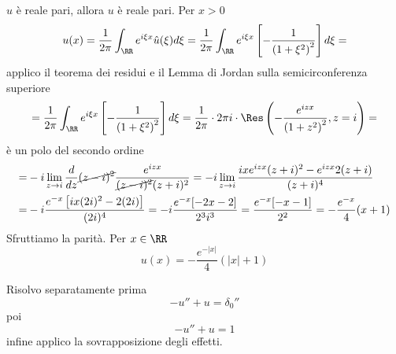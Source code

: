 $\hat{u}$ è reale pari, allora $u$ è reale pari. Per $x > 0$
\begin{equation*}
u(x) = \frac{1}{2\pi}\int_{\RR} e^{i\xi x}\hat{u}(\xi) d\xi = \frac{1}{2\pi}\int_{\RR} e^{i\xi x}\left[ - \frac{1}{\left(1 + \xi^{2}\right)^{2}}\right] d\xi =
\end{equation*}
applico il teorema dei residui e il Lemma di Jordan sulla semicirconferenza superiore
\begin{equation*}
= \frac{1}{2\pi}\int_{\RR} e^{i\xi x}\left[ - \frac{1}{\left(1 + \xi^{2}\right)^{2}}\right] d\xi = \frac{1}{2\pi} \cdot 2\pi i \cdot \Res \left(- \frac{e^{izx}}{\left(1 + z^{2}\right)^{2}}, z = i\right) =
\end{equation*}
è un polo del secondo ordine
\begin{equation*}
\begin{aligned}
= & - i\lim\limits_{z\rightarrow i}\frac{d}{dz}\cancel{(z - i)^{2}}\frac{e^{izx}}{\cancel{(z - i)^{2}}(z + i)^{2}} = - i\lim\limits_{z\rightarrow i}\frac{ixe^{izx}(z + i)^{2} - e^{izx} 2(z + i)}{(z + i)^{4}}\\
= & - i\frac{e^{- x}\left[ ix(2i)^{2} - 2(2i)\right]}{(2i)^{4}} = - i\frac{e^{- x}[ - 2x - 2]}{2^{3} i^{3}} = \frac{e^{- x}[ - x - 1]}{2^{2}} = - \frac{e^{- x}}{4}(x + 1)
\end{aligned}
\end{equation*}
Sfruttiamo la parità. Per $x\in \RR $
\begin{equation*}
u(x) = - \frac{e^{- | x|}}{4}(| x| + 1)
\end{equation*}

\Soluzione

Risolvo separatamente prima
\begin{equation*}
- u'' + u = \delta_{0}''
\end{equation*}
poi
\begin{equation*}
- u'' + u = 1
\end{equation*}
infine applico la sovrapposizione degli effetti.

